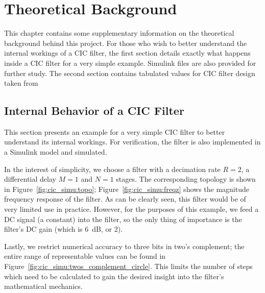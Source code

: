 %
%
\chapter{Theoretical Background} %
\label{ch:app:theoretical_background}

This  chapter  contains  some  supplementary information  on  the  theoretical
background behind  this project. For those  who wish to better  understand the
internal  workings of  a CIC  filter, the first section  details exactly  what
happens inside a CIC filter for a very simple example. Simulink files are also
provided for further  study. The second section contains  tabulated values for
CIC filter design taken from~\cite{1163535}

\section{Internal Behavior of a CIC Filter} %
\label{sec:app:cic_simu}

This  section presents  an example  for  a very  simple CIC  filter to  better
understand  its  internal  workings. For  verification,  the  filter  is  also
implemented in a Simulink model and simulated.

In the interest of simplicity, we choose  a filter with a decimation rate $R =
2$, a differential delay $M=1$ and $N=1$ stages. The corresponding topology is
shown in Figure~\ref{fig:cic_simu:topo}; Figure~\ref{fig:cic_simu:freqz} shows
the magnitude frequency  response of the filter. As can be  clearly seen, this
filter would be of very limited  use in practice. However, for the purposes of
this example, we  feed a DC  signal (a constant) into the  filter, so the
only thing  of importance is  the filter's DC  gain (which is  \SI{6}{\dB}, or
\num{2}).

Lastly,   we   restrict   numerical   accuracy  to   three   bits   in   two's
complement;  the  entire  range  of  representable  values  can  be  found  in
Figure~\ref{fig:cic_simu:twos_complement_circle}. This  limits  the number  of
steps  which need  to  be calculated  to  gain the  desired  insight into  the
filter's mathematical mechanics.


